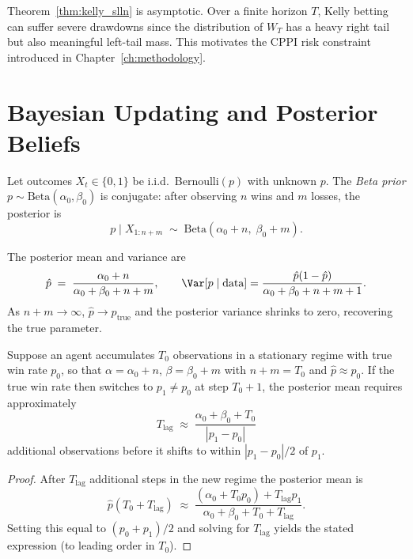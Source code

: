\begin{remark}
Theorem~\ref{thm:kelly_slln} is asymptotic.  Over a finite horizon $T$,
Kelly betting can suffer severe drawdowns since the distribution of $W_T$
has a heavy right tail but also meaningful left-tail mass.  This motivates
the CPPI risk constraint introduced in Chapter~\ref{ch:methodology}.
\end{remark}

\section{Bayesian Updating and Posterior Beliefs}

\begin{definition}
Let outcomes $X_t \in \{0,1\}$ be i.i.d.\ Bernoulli$(p)$ with unknown $p$.
The \emph{Beta prior} $p \sim \text{Beta}(\alpha_0, \beta_0)$ is conjugate:
after observing $n$ wins and $m$ losses, the posterior is
\begin{equation}
    p \mid X_{1:n+m} \;\sim\; \text{Beta}(\alpha_0 + n,\; \beta_0 + m).
    \label{eq:beta_posterior}
\end{equation}
\end{definition}

The posterior mean and variance are
\[
    \hat p \;=\; \frac{\alpha_0 + n}{\alpha_0 + \beta_0 + n + m},
    \qquad
    \Var[p \mid \text{data}] = \frac{\hat p(1-\hat p)}{\alpha_0+\beta_0+n+m+1}.
\]
As $n + m \to \infty$, $\hat p \to p_{\text{true}}$ and the posterior
variance shrinks to zero, recovering the true parameter.

\begin{proposition}
\label{prop:sticky_prior}
Suppose an agent accumulates $T_0$ observations in a stationary regime with
true win rate $p_0$, so that $\alpha = \alpha_0 + n$, $\beta = \beta_0 + m$
with $n + m = T_0$ and $\hat p \approx p_0$.  If the true win rate then
switches to $p_1 \neq p_0$ at step $T_0 + 1$, the posterior mean requires
approximately
\[
    T_{\text{lag}} \;\approx\;
    \frac{\alpha_0 + \beta_0 + T_0}{|p_1 - p_0|}
\]
additional observations before it shifts to within $|p_1 - p_0|/2$ of $p_1$.
\end{proposition}

\begin{proof}
After $T_{\text{lag}}$ additional steps in the new regime the posterior mean is
\[
    \hat p(T_0 + T_{\text{lag}}) \;\approx\;
    \frac{(\alpha_0 + T_0 p_0) + T_{\text{lag}} p_1}{\alpha_0+\beta_0+T_0+T_{\text{lag}}}.
\]
Setting this equal to $(p_0 + p_1)/2$ and solving for $T_{\text{lag}}$ yields the
stated expression (to leading order in $T_0$).
\end{proof}

